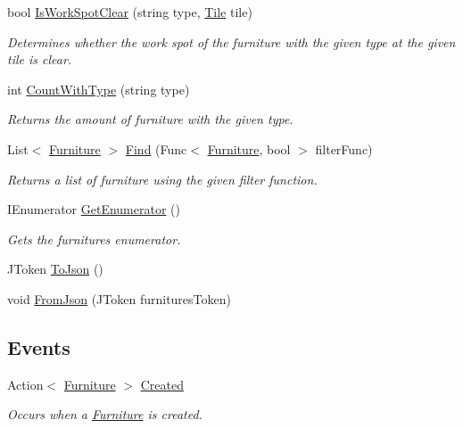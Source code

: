 \begin{DoxyCompactItemize}
bool \hyperlink{class_furniture_manager_a82b6dcc693f7e66ee2cc65bfc9073efb}{Is\+Work\+Spot\+Clear} (string type, \hyperlink{class_tile}{Tile} tile)
\begin{DoxyCompactList}\small\item\em Determines whether the work spot of the furniture with the given type at the given tile is clear. \end{DoxyCompactList}\item 
int \hyperlink{class_furniture_manager_a70313492579a8ea148e6f44801295c12}{Count\+With\+Type} (string type)
\begin{DoxyCompactList}\small\item\em Returns the amount of furniture with the given type. \end{DoxyCompactList}\item 
List$<$ \hyperlink{class_furniture}{Furniture} $>$ \hyperlink{class_furniture_manager_a51c4836f1c5143937591e7ba2bbf5421}{Find} (Func$<$ \hyperlink{class_furniture}{Furniture}, bool $>$ filter\+Func)
\begin{DoxyCompactList}\small\item\em Returns a list of furniture using the given filter function. \end{DoxyCompactList}\item 
I\+Enumerator \hyperlink{class_furniture_manager_ae0592610047ec63534e486aea0efe024}{Get\+Enumerator} ()
\begin{DoxyCompactList}\small\item\em Gets the furnitures enumerator. \end{DoxyCompactList}\item 
J\+Token \hyperlink{class_furniture_manager_aa383347dc534e4f52ae0fbb3729fe220}{To\+Json} ()
\item 
void \hyperlink{class_furniture_manager_a3e1027bf9740154600e18d726e73e2fd}{From\+Json} (J\+Token furnitures\+Token)
\end{DoxyCompactItemize}
\subsection*{Events}
\begin{DoxyCompactItemize}
\item 
Action$<$ \hyperlink{class_furniture}{Furniture} $>$ \hyperlink{class_furniture_manager_a40726185433919d2017c568af6deef33}{Created}
\begin{DoxyCompactList}\small\item\em Occurs when a \hyperlink{class_furniture}{Furniture} is created. \end{DoxyCompactList}\end{DoxyCompactItemize}


